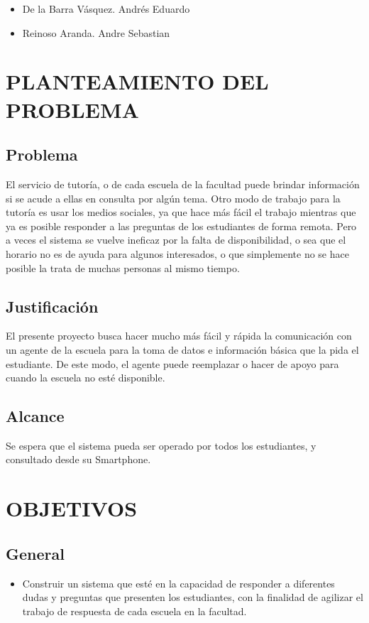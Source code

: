 \documentclass[12pt,letterpaper]{article}
\begin{document}
\begin{itemize}
	\item De la Barra Vásquez. Andrés Eduardo
	\item Reinoso Aranda. Andre Sebastian
	
\end{itemize}

\section{PLANTEAMIENTO DEL PROBLEMA}
	\subsection{Problema}
El servicio de tutoría, o de cada escuela de la facultad puede brindar información si se acude a ellas en consulta por algún tema. Otro modo de trabajo para la tutoría es usar los medios sociales, ya que hace más fácil el trabajo mientras que ya es posible responder a las preguntas de los estudiantes de forma remota. Pero a veces el sistema se vuelve ineficaz por la falta de disponibilidad, o sea que el horario no es de ayuda para algunos interesados, o que simplemente no se hace posible la trata de muchas personas al mismo tiempo.\\
	\subsection{Justificación}
El presente proyecto busca hacer mucho más fácil y rápida la comunicación con un agente de la escuela para la toma de datos e información básica que la pida el estudiante. De este modo, el agente puede reemplazar o hacer de apoyo para cuando la escuela no esté disponible.
	\subsection{Alcance}
Se espera que el sistema pueda ser operado por todos los estudiantes, y consultado desde su Smartphone.

\section{OBJETIVOS}
	\subsection{General}
\begin{itemize}
	\item Construir un sistema que esté en la capacidad de responder a diferentes dudas y preguntas que presenten los estudiantes, con la finalidad de agilizar el trabajo de respuesta de cada escuela en la facultad.
\end{itemize}
\end{document}

